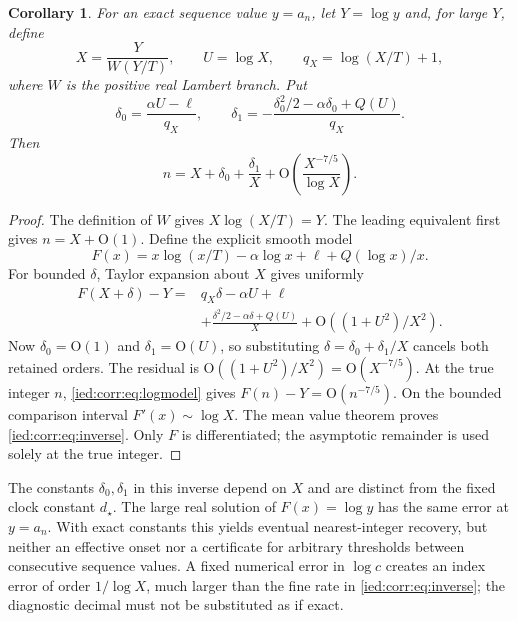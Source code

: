 \documentclass[11pt,letterpaper]{article}
\newtheorem{corollary}[theorem]{Corollary}
\theoremstyle{remark}\newtheorem{remark}[theorem]{Remark}
\newcommand{\Oh}{\mathrm O}\newcommand{\supp}{\operatorname{supp}}
\begin{document}
\begin{corollary}\label{ied:corr:cor:inverse}
For an exact sequence value $y=a_n$, let $Y=\log y$ and, for large $Y$, define
\begin{equation}\label{ied:corr:eq:inversevars}
 X=\frac{Y}{W(Y/T)},\qquad U=\log X,\qquad q_X=\log(X/T)+1,
\end{equation}
where $W$ is the positive real Lambert branch. Put
\begin{equation}\label{ied:corr:eq:inversecoeffs}
 \delta_0=\frac{\alpha U-\ell}{q_X},\qquad
 \delta_1=-\frac{\delta_0^2/2-\alpha\delta_0+Q(U)}{q_X}.
\end{equation}
Then
\begin{equation}\label{ied:corr:eq:inverse}
 n=X+\delta_0+\frac{\delta_1}{X}
          +\Oh\left(\frac{X^{-7/5}}{\log X}\right).
\end{equation}
\end{corollary}
\begin{proof}
The definition of $W$ gives $X\log(X/T)=Y$. The leading equivalent first gives $n=X+\Oh(1)$. Define the explicit smooth model
\[
 F(x)=x\log(x/T)-\alpha\log x+\ell+Q(\log x)/x.
\]
For bounded $\delta$, Taylor expansion about $X$ gives uniformly
\begin{align*}
 F(X+\delta)-Y={}&q_X\delta-\alpha U+\ell\\
 &+\frac{\delta^2/2-\alpha\delta+Q(U)}X
 +\Oh((1+U^2)/X^2).
\end{align*}
Now $\delta_0=\Oh(1)$ and $\delta_1=\Oh(U)$, so substituting
$\delta=\delta_0+\delta_1/X$ cancels both retained orders. The residual is
$\Oh((1+U^2)/X^2)=\Oh(X^{-7/5})$. At the true integer $n$, \eqref{ied:corr:eq:logmodel} gives $F(n)-Y=\Oh(n^{-7/5})$. On the bounded comparison interval $F'(x)\sim\log X$. The mean value theorem proves \eqref{ied:corr:eq:inverse}. Only $F$ is differentiated; the asymptotic remainder is used solely at the true integer.
\end{proof}
The constants $\delta_0,\delta_1$ in this inverse depend on $X$ and are distinct from the fixed clock constant $d_\star$. The large real solution of $F(x)=\log y$ has the same error at $y=a_n$. With exact constants this yields eventual nearest-integer recovery, but neither an effective onset nor a certificate for arbitrary thresholds between consecutive sequence values. A fixed numerical error in $\log c$ creates an index error of order $1/\log X$, much larger than the fine rate in \eqref{ied:corr:eq:inverse}; the diagnostic decimal must not be substituted as if exact.
\end{document}

